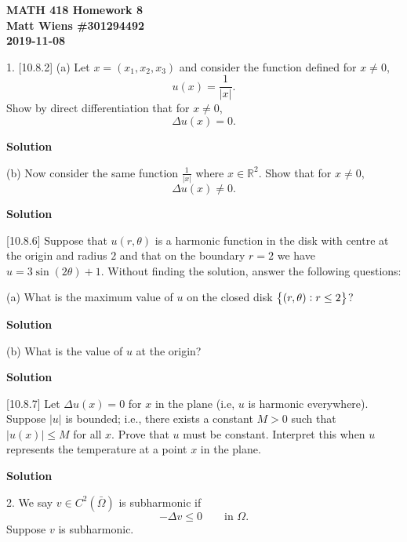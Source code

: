 \documentclass{article}
\begin{document}
\textbf{MATH 418 Homework 8} \\
\textbf{Matt Wiens \#301294492} \\
\textbf{2019-11-08}

1. [10.8.2] (a) Let $x = (x_1, x_2, x_3)$ and consider the function
defined for $x \neq 0$,
%
\begin{equation*}
    u(x) = \frac{1}{|x|}
    .
\end{equation*}
%
Show by direct differentiation that for $x \neq 0$,
%
\begin{equation*}
    \Delta u(x) = 0
    .
\end{equation*}

\textbf{Solution}

\vspace{5mm}

(b) Now consider the same function $\frac{1}{|x|}$ where $x \in
\mathbb{R}^2$. Show that for $x \neq 0$,
%
\begin{equation*}
    \Delta u(x) \neq 0
    .
\end{equation*}

\textbf{Solution}

\vspace{5mm}

[10.8.6] Suppose that $u(r, \theta)$ is a harmonic function in the disk
with centre at the origin and radius $2$ and that on the boundary $r =
2$ we have $u = 3 \sin (2 \theta) + 1$. Without finding the solution,
answer the following questions:

(a) What is the maximum value of $u$ on the closed disk $\cbr{(r,
\theta) : r \leq 2}$?

\textbf{Solution}

\vspace{5mm}

(b) What is the value of $u$ at the origin?

\textbf{Solution}

\vspace{5mm}

[10.8.7] Let $\Delta u(x) = 0$ for $x$ in the plane (i.e, $u$ is
harmonic everywhere). Suppose $|u|$ is bounded; i.e., there exists a
constant $M > 0$ such that $|u(x)| \leq M$ for all $x$. Prove that $u$
must be constant. Interpret this when $u$ represents the temperature at
a point $x$ in the plane.

\textbf{Solution}

\newpage

2. We say $v \in C^2(\bar \Omega)$ is subharmonic if
%
\begin{equation*}
    - \Delta v \leq 0 \qquad \text{in } \Omega
    .
\end{equation*}
%
Suppose $v$ is subharmonic.
\end{document}
